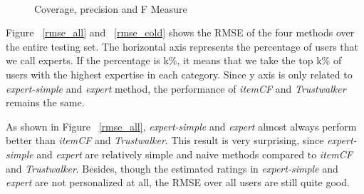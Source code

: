 \documentclass[12pt]{article}
\begin{document}
\begin{figure}[htbp]
	\centering
	\\
	\caption{Coverage, precision and F Measure}
\end{figure}

Figure ~\ref{rmse_all} and ~\ref{rmse_cold} shows the RMSE of the four methods over the entire testing set. The horizontal axis represents the percentage of users that we call experts. If the percentage is k\%, it means that we take the top k\% of users with the highest expertise in each category. Since y axis is only related to \emph{expert-simple} and \emph{expert} method, the performance of \emph{itemCF} and \emph{Trustwalker} remains the same. 

As shown in Figure ~\ref{rmse_all}, \emph{expert-simple} and \emph{expert} almost always perform better than \emph{itemCF} and \emph{Trustwalker}. This result is very surprising, since \emph{expert-simple} and \emph{expert} are relatively simple and naive methods compared to \emph{itemCF} and \emph{Trustwalker}. Besides, though the estimated ratings in \emph{expert-simple} and \emph{expert} are not personalized at all, the RMSE over all users are still quite good. 
\end{document}
